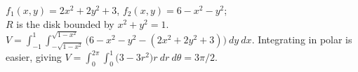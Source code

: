{$f_1(x,y) = 2x^2+2y^2+3$, $f_2(x,y) = 6-x^2-y^2$;\\
$R$ is the disk bounded by $x^2+y^2=1$.
}
{$V = \int_{-1}^{1}\int_{-\sqrt{1-x^2}}^{\sqrt{1-x^2}} \big(6-x^2-y^2-(2x^2+2y^2+3))\ dy\ dx$. Integrating in polar is easier, giving $V = \int_0^{2\pi}\int_0^1 \big(3-3r^2\big)r\ dr\ d\theta = 3\pi/2$.
}
